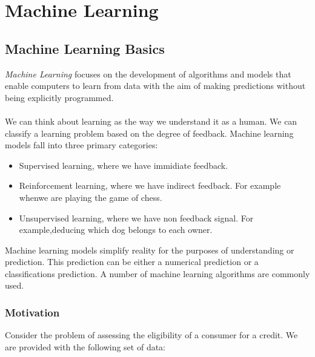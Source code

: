 \documentclass[../main.tex]{subfiles}
\begin{document}
	\chapter{Machine Learning} \label{ch:machine}
	

	\section{Machine Learning Basics}
	\noindent 
	
	\noindent  \textit{Machine Learning} focuses on the development of algorithms and models that enable computers to learn from data with the aim of making predictions without being explicitly programmed.\\ \\  
	We can think about learning as the way we understand it as a human. We can classify a learning problem based on the degree of feedback. Machine learning models fall into three primary categories:
	\begin{itemize}
		\item Supervised learning, where we have immidiate feedback.
		\item Reinforcement learning, where we have indirect feedback. For example whenwe are playing the game of chess.
		\item Unsupervised learning, where we have non feedback signal. For example,deducing which dog belongs to each owner.
	\end{itemize}
	Machine learning models simplify reality for the purposes of understanding or prediction. This prediction can be either a numerical prediction or a classifications prediction. 
	A number of machine learning algorithms are commonly used.
	
	
	\subsection{Motivation }
	\noindent Consider the problem of assessing the eligibility of a consumer for a credit. We are provided with the following set of data: \\ 
	
\end{document}
